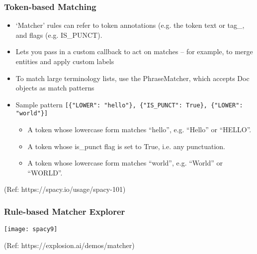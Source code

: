 \begin{frame}[fragile]\frametitle{Token-based Matching }

  \begin{itemize}
    \item `Matcher' rules can refer to token annotations (e.g. the token text or tag\_, and flags (e.g. IS\_PUNCT).
		\item Lets you pass in a custom callback to act on matches – for example, to merge entities and apply custom labels
		\item To match large terminology lists, use the PhraseMatcher, which accepts Doc objects as match patterns
		\item Sample pattern \lstinline|[{"LOWER": "hello"}, {"IS_PUNCT": True}, {"LOWER": "world"}]|
  \begin{itemize}
    \item A token whose lowercase form matches “hello”, e.g. “Hello” or “HELLO”.
    \item A token whose is\_punct flag is set to True, i.e. any punctuation.
    \item A token whose lowercase form matches “world”, e.g. “World” or “WORLD”.
  \end{itemize}		
  \end{itemize}
	
{\tiny (Ref: https://spacy.io/usage/spacy-101)}
\end{frame}


\begin{frame}[fragile]\frametitle{Rule-based Matcher Explorer}

\begin{center}
\texttt{[image: spacy9]}
\end{center}

{\tiny (Ref: https://explosion.ai/demos/matcher)}
\end{frame}


